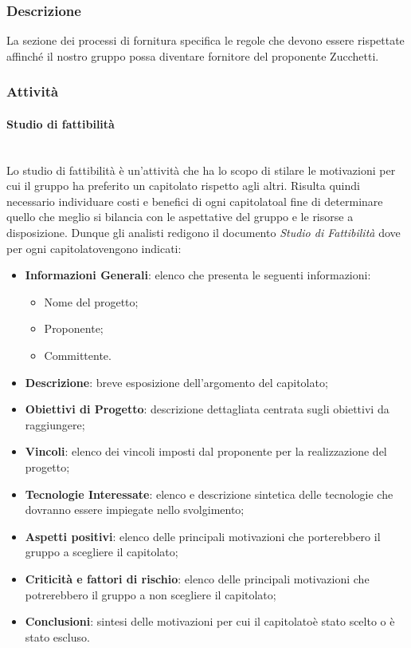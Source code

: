 \subsubsection{Descrizione}
La sezione dei processi di fornitura specifica le regole che devono essere rispettate affinché il nostro gruppo possa diventare fornitore del proponente Zucchetti.
\subsubsection{Attività}
\paragraph{Studio di fattibilità}\mbox{}\\ [1mm]
Lo studio di fattibilità è un'attività che ha lo scopo di stilare le motivazioni per cui il gruppo ha preferito un capitolato rispetto agli altri.
Risulta quindi necessario individuare costi e benefici di ogni capitolato\glosp al fine di determinare quello che meglio si bilancia con le aspettative del gruppo e le risorse a disposizione.
Dunque gli analisti redigono il documento \textit{Studio di Fattibilità} dove per ogni capitolato\glosp vengono indicati:
\begin{itemize}
	\item \textbf{Informazioni Generali}: elenco che presenta le seguenti informazioni: 
	\begin{itemize}
		\item Nome del progetto;
		\item Proponente;
		\item Committente.
	\end{itemize} 
	\item \textbf{Descrizione}: breve esposizione dell'argomento del capitolato\glo;
	\item \textbf{Obiettivi di Progetto}: descrizione dettagliata centrata sugli obiettivi da raggiungere;
	\item \textbf{Vincoli}: elenco dei vincoli imposti dal proponente per la realizzazione del progetto;
	\item \textbf{Tecnologie Interessate}: elenco e descrizione sintetica delle tecnologie che dovranno essere impiegate nello svolgimento;
	\item \textbf{Aspetti positivi}: elenco delle principali motivazioni che porterebbero il gruppo a scegliere il capitolato\glo;
	\item \textbf{Criticità e fattori di rischio}: elenco delle principali motivazioni che potrerebbero il gruppo a non scegliere il capitolato\glo;
	\item \textbf{Conclusioni}: sintesi delle motivazioni per cui il capitolato\glosp è stato scelto o è stato escluso.
\end{itemize}
